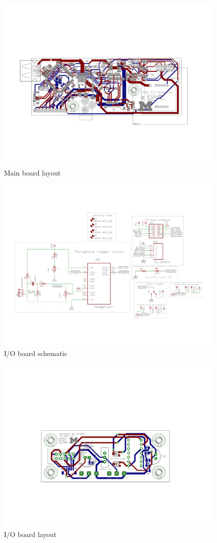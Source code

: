 \documentclass[12pt]{article}
\begin{document}
\begin{figure}[h]
    \centering
    \includegraphics[angle=-90,width=0.99\textwidth]{BodyCamBoard_brd}
    \caption{Main board layout}
\end{figure}

\begin{figure}[h]
    \centering
    \includegraphics[angle=-90,width=0.99\textwidth]{IOBoard_sch}
    \caption{I/O board schematic}
\end{figure}

\begin{figure}[h]
    \centering
    \includegraphics[angle=-90,width=0.99\textwidth]{IOBoard_brd}
    \caption{I/O board layout}
\end{figure}
\end{document}
